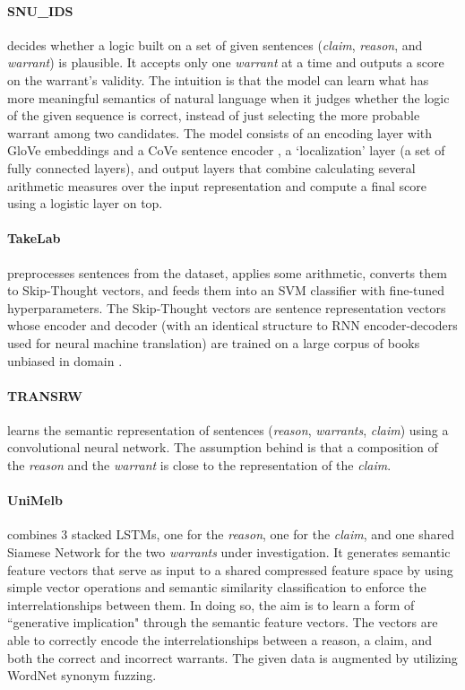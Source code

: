 \paragraph{SNU\_IDS}
decides whether a logic built on a set of given sentences (\emph{claim}, \emph{reason}, and \emph{warrant}) is plausible. It accepts only one \emph{warrant} at a time and outputs a score on the warrant's validity. The intuition is that the model can learn what has more meaningful semantics of natural language when it judges whether the logic of the given sequence is correct, instead of just selecting the more probable warrant among two candidates. The model consists of an encoding layer with GloVe embeddings \cite{Pennington.2014} and a CoVe sentence encoder \cite{McCann.et.al.2017.NIPS}, a `localization' layer (a set of fully connected layers), and output layers that combine calculating several arithmetic measures over the input representation and compute a final score using a logistic layer on  top.


\paragraph{TakeLab}
preprocesses sentences from the data\-set, applies some arithmetic, converts them to Skip-Thought vectors, and feeds them into an SVM classifier with fine-tuned hyperparameters. The Skip-Thought vectors are sentence representation vectors whose encoder and decoder (with an identical structure to RNN encoder-decoders used for neural machine translation) are trained on a large corpus of books unbiased in domain \cite{Kiros.et.al.2015}.


\paragraph{TRANSRW}
learns the semantic representation of sentences (\emph{reason}, \emph{warrants}, \emph{claim}) using a convolutional neural network. The assumption behind is that a composition of the \emph{reason} and the \emph{warrant} is close to the representation of the \emph{claim}.


\paragraph{UniMelb}
combines 3 stacked LSTMs, one for the \emph{reason}, one for the \emph{claim}, and one shared Siamese Network for the two \emph{warrants} under investigation. It generates semantic feature vectors that serve as input to a shared compressed feature space by using simple vector operations and semantic similarity classification to enforce the interrelationships between them. In doing so, the aim is to learn a form of ``generative implication" through the semantic feature vectors. The vectors are able to correctly encode the interrelationships between a reason, a claim, and both the correct and incorrect warrants. The given data is augmented by utilizing WordNet synonym fuzzing.


